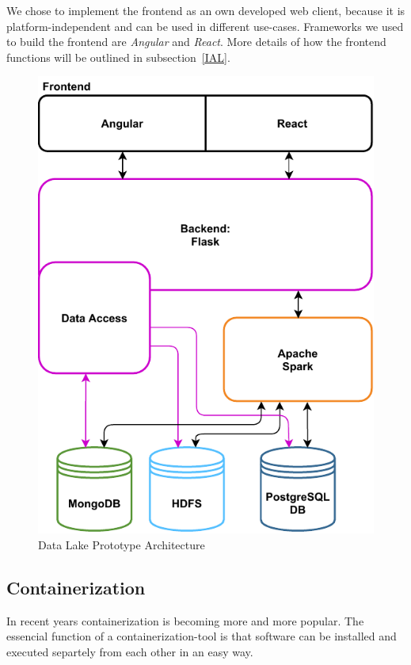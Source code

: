 \documentclass[conference]{IEEEtran}
\begin{document}
We chose to implement the frontend as an own developed web client, because it is 
platform-independent and can be used in different use-cases.
Frameworks we used to build the frontend are \textit{Angular} and \textit{React}.
More details of how the frontend functions will be outlined in subsection~\ref{IAL}.

\begin{figure}[h]
\centerline{\includegraphics[scale=0.8]{graphics/data_lake_prototype_arch.pdf}}
\caption{Data Lake Prototype Architecture}
\label{DLPA}
\end{figure}

\subsection{Containerization}\label{CTN}
In recent years containerization is becoming more and more popular. 
The essencial function of a containerization-tool is that software can be installed and executed 
separtely from each other in an easy way. 
\end{document}

